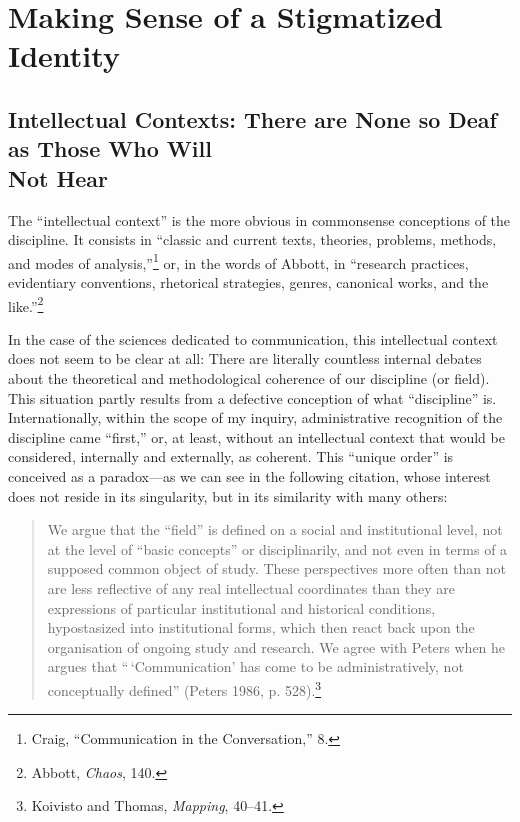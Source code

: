 \documentclass{tufte-handout}
\begin{document}
\hypertarget{making-sense-of-a-stigmatized-identity}{%
\section{Making Sense of a Stigmatized
Identity}\label{making-sense-of-a-stigmatized-identity}}

\hypertarget{intellectual-contexts-there-are-none-so-deaf-as-those-who-will-not-hear}{%
\subsection{Intellectual Contexts: There are
None so Deaf as Those Who Will\\\noindent Not
Hear}\label{intellectual-contexts-there-are-none-so-deaf-as-those-who-will-not-hear}}

\enlargethispage{\baselineskip}

The ``intellectual context'' is the more obvious in commonsense
conceptions of the discipline. It consists in ``classic and current
texts, theories, problems, methods, and modes of analysis,''\footnote{Craig,
  ``Communication in the Conversation,'' 8.} or, in the words of Abbott,
in ``research practices, evidentiary conventions, rhetorical strategies,
genres, canonical works, and the like.''\footnote{Abbott, \emph{Chaos},
  140.}

In the case of the sciences dedicated to communication, this
intellectual context does not seem to be clear at all: There are
literally countless internal debates about the theoretical and
methodological coherence of our discipline (or field). This situation
partly results from a defective conception of what ``discipline'' is.
Internationally, within the scope of my inquiry, administrative
recognition of the discipline came ``first,'' or, at least, without an
intellectual context that would be considered, internally and
externally, as coherent. This ``unique order'' is conceived as a
paradox---as we can see in the following citation, whose interest does
not reside in its singularity, but in its similarity with many others:

\begin{quote}
We argue that the ``field'' is defined on a social and institutional
level, not at the level of ``basic concepts'' or disciplinarily, and not
even in terms of a supposed common object of study. These perspectives
more often than not are less reflective of any real intellectual
coordinates than they are expressions of particular institutional and
historical conditions, hypostasized into institutional forms, which then
react back upon the organisation of ongoing study and research. We agree
with Peters when he argues that ``\,`Communication' has come to be
administratively, not conceptually defined'' (Peters 1986, p.
528).\footnote{Koivisto and Thomas, \emph{Mapping}, 40--41.}
\end{quote}
\end{document}
